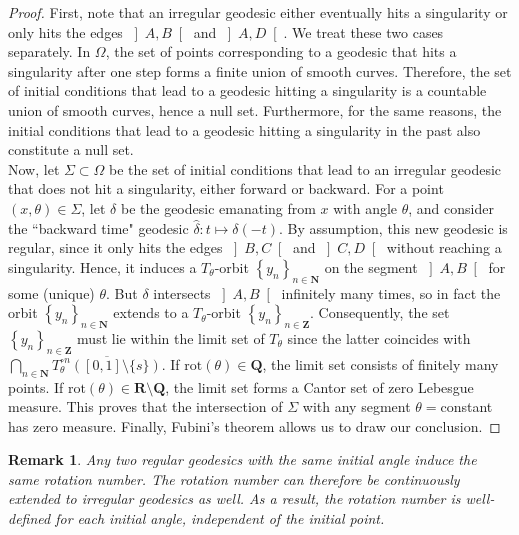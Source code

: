 \documentclass[11pt]{article}
\newtheorem*{rmk}{Remark}
\begin{document}
\begin{proof}
    First, note that an irregular geodesic either eventually hits a singularity or only hits the edges $\left]A,B\right[$ and $\left]A,D\right[$. We treat these two cases separately. In $\Omega$, the set of points corresponding to a geodesic that hits a singularity after one step forms a finite union of smooth curves. Therefore, the set of initial conditions that lead to a geodesic hitting a singularity is a countable union of smooth curves, hence a null set. Furthermore, for the same reasons, the initial conditions that lead to a geodesic hitting a singularity in the past also constitute a null set.\\
    Now, let $\Sigma\subset\Omega$ be the set of initial conditions that lead to an irregular geodesic that does not hit a singularity, either forward or backward. For a point $\left(x,\theta\right)\in\Sigma$, let $\delta$ be the geodesic emanating from $x$ with angle $\theta$, and consider the ``backward time" geodesic $\hat{\delta}:t\mapsto\delta(-t)$. By assumption, this new geodesic is regular, since it only hits the edges $\left]B,C\right[$ and $\left]C,D\right[$ without reaching a singularity. Hence, it induces a $T_{\theta}$-orbit $\left\{y_{n}\right\}_{n\in\mathbf{N}}$ on the segment $\left]A,B\right[$ for some (unique) $\theta$. But $\delta$ intersects $\left]A,B\right[$ infinitely many times, so in fact the orbit $\left\{y_{n}\right\}_{n\in\mathbf{N}}$ extends to a $T_{\theta}$-orbit $\left\{y_{n}\right\}_{n\in\mathbf{Z}}$. Consequently, the set $\left\{y_{n}\right\}_{n\in\mathbf{Z}}$ must lie within the limit set of $T_{\theta}$ since the latter coincides with $\bigcap_{n\in\mathbf{N}}\overline{T_{\theta}^{\circ n}([0,1]\setminus\{s\})}$. If $\text{rot}(\theta)\in\mathbf{Q}$, the limit set consists of finitely many points. If $\text{rot}(\theta)\in\mathbf{R}\setminus\mathbf{Q}$, the limit set forms a Cantor set of zero Lebesgue measure. This proves that the intersection of $\Sigma$ with any segment $\theta=$constant has zero measure. Finally, Fubini's theorem allows us to draw our conclusion.
\end{proof}

\begin{rmk}
    Any two regular geodesics with the same initial angle induce the same rotation number. The rotation number can therefore be continuously extended to irregular geodesics as well. As a result, the rotation number is well-defined for each initial angle, independent of the initial point.
\end{rmk} 
\end{document}
